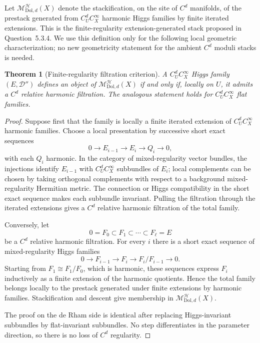 \documentclass[11pt,reqno]{amsart}
\newtheorem{theorem}{Theorem}[section]
\theoremstyle{definition}
\theoremstyle{remark}
\newcommand{\cD}{\mathcal D}
\newcommand{\cH}{\mathcal H}
\newcommand{\Dol}{\mathrm{Dol}}
\begin{document}
Let $\mathscr M_{\Dol,d}^{\cH}(X)$ denote the stackification, on the site of $C^d$ manifolds, of the prestack generated from $C^d_UC^\infty_X$ harmonic Higgs families by finite iterated extensions.  This is the finite-regularity extension-generated stack proposed in Question~5.3.4.  We use this definition only for the following local geometric characterization; no new geometricity statement for the ambient $C^d$ moduli stacks is needed.

\begin{theorem}[Finite-regularity filtration criterion]\label{thm:Cd-filtration-criterion}
A $C^d_UC^\infty_X$ Higgs family $(E,\cD'')$ defines an object of $\mathscr M_{\Dol,d}^{\cH}(X)$ if and only if, locally on $U$, it admits a $C^d$ relative harmonic filtration.  The analogous statement holds for $C^d_UC^\infty_X$ flat families.
\end{theorem}

\begin{proof}
Suppose first that the family is locally a finite iterated extension of $C^d_UC^\infty_X$ harmonic families.  Choose a local presentation by successive short exact sequences
\[
  0\to E_{i-1}\to E_i\to Q_i\to0,
\]
with each $Q_i$ harmonic.  In the category of mixed-regularity vector bundles, the injections identify $E_{i-1}$ with $C^d_UC^\infty_X$ subbundles of $E_i$; local complements can be chosen by taking orthogonal complements with respect to a background mixed-regularity Hermitian metric.  The connection or Higgs compatibility in the short exact sequence makes each subbundle invariant.  Pulling the filtration through the iterated extensions gives a $C^d$ relative harmonic filtration of the total family.

Conversely, let
\[
  0=F_0\subset F_1\subset\cdots\subset F_\ell=E
\]
be a $C^d$ relative harmonic filtration.  For every $i$ there is a short exact sequence of mixed-regularity Higgs families
\[
  0\longrightarrow F_{i-1}
  \longrightarrow F_i
  \longrightarrow F_i/F_{i-1}
  \longrightarrow0.
\]
Starting from $F_1\cong F_1/F_0$, which is harmonic, these sequences express $F_i$ inductively as a finite extension of the harmonic quotients.  Hence the total family belongs locally to the prestack generated under finite extensions by harmonic families.  Stackification and descent give membership in $\mathscr M_{\Dol,d}^{\cH}(X)$.

The proof on the de Rham side is identical after replacing Higgs-invariant subbundles by flat-invariant subbundles.  No step differentiates in the parameter direction, so there is no loss of $C^d$ regularity.
\end{proof}
\end{document}
